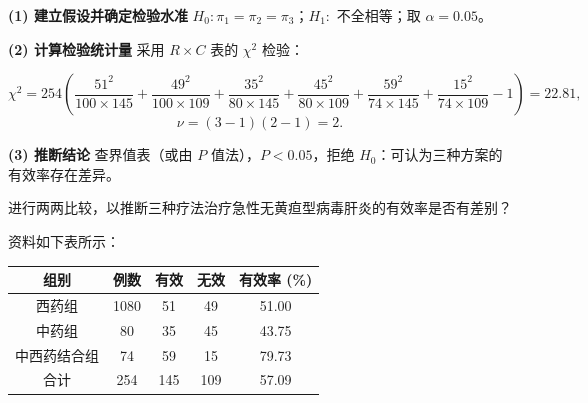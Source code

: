 \documentclass[lang=cn,10pt]{elegantbook}
\begin{document}
\begin{solution}
\textbf{(1) 建立假设并确定检验水准}\quad
$H_0: \pi_1=\pi_2=\pi_3$；$H_1:$ 不全相等；取 $\alpha=0.05$。

\textbf{(2) 计算检验统计量}\quad
采用 $R\times C$ 表的 $\chi^2$ 检验：

\[
\chi^2=254\!\left(\frac{51^2}{100\times145}+\frac{49^2}{100\times109}+\frac{35^2}{80\times145}+\frac{45^2}{80\times109}+\frac{59^2}{74\times145}+\frac{15^2}{74\times109}-1\right)=22.81,
\]
\[
\nu=(3-1)(2-1)=2.
\]

\textbf{(3) 推断结论}\quad
查界值表（或由 $P$ 值法），$P<0.05$，拒绝 $H_0$：可认为三种方案的有效率存在差异。
\end{solution}

\begin{exercise}
进行两两比较，以推断三种疗法治疗急性无黄疸型病毒肝炎的有效率是否有差别？

资料如下表所示：
\begin{center}
\begin{tabular}{ccccc}
  \hline
  组别 & 例数 & 有效 & 无效 & 有效率 (\%) \\
  \hline
  西药组 & 1080 & 51 & 49 & 51.00 \\
  中药组 & 80 & 35 & 45 & 43.75 \\
  中西药结合组 & 74 & 59 & 15 & 79.73 \\
  \hline
  合计 & 254 & 145 & 109 & 57.09 \\
  \hline
\end{tabular}
\end{center}
\end{exercise}
\end{document}
